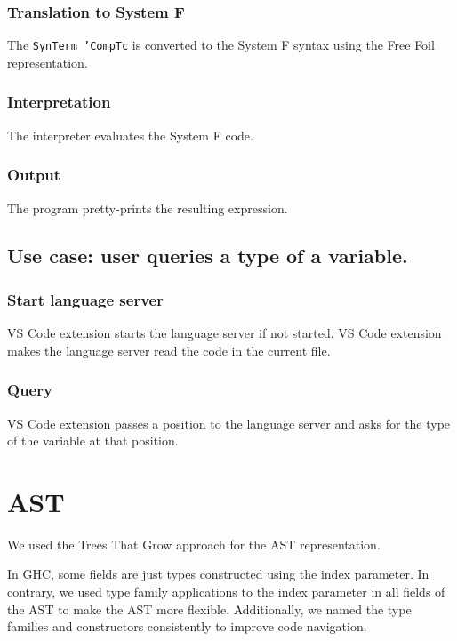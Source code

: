 \subsubsection{Translation to System F}

The \texttt{SynTerm 'CompTc} is converted to the System F syntax using the Free Foil representation.

\subsubsection{Interpretation}

The interpreter evaluates the System F code.

\subsubsection{Output}

The program pretty-prints the resulting expression.

\subsection{Use case: user queries a type of a variable.}

\subsubsection{Start language server}
VS Code extension starts the language server if not started.
VS Code extension makes the language server read the code in the current file.

\subsubsection{Query}

VS Code extension passes a position to the language server and asks for the type of the variable at that position.

\section{AST}

We used the Trees That Grow approach \cite{trees-that-grow-2016} for the AST representation.

In GHC, some fields are just types constructed using the index parameter. In contrary, we used type family applications to the index parameter in all fields of the AST to make the AST more flexible. Additionally, we named the type families and constructors consistently to improve code navigation.


